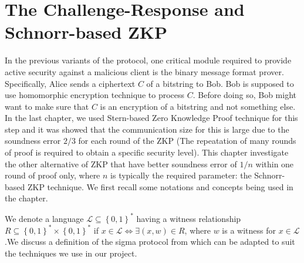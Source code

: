 \section{The Challenge-Response and Schnorr-based ZKP}
\label{sec:6challenge}
In the previous variants of the protocol, one critical module required to
provide active security against a malicious client is the binary message format
prover. Specifically, Alice sends a ciphertext \(C\) of a bitstring to Bob. Bob
is supposed to use homomorphic encryption technique to process \(C\). Before
doing so, Bob might want to make sure that \(C\) is an encryption of a bitstring
and not something else. In the last chapter, we used Stern-based Zero Knowledge
Proof technique for this step and it was showed that the communication size for
this is large due to the soundness error $2/3$ for each round of the ZKP (The
repeatation of many rounds of proof is required to obtain a specific security
level). This chapter investigate the other alternative of ZKP that have better
soundness error of $1/n$ within one round of proof only, where $n$ is typically
the required parameter: the Schnorr-based ZKP technique. We first recall some
notations and concepts being used in the chapter.

We denote a language $\mathcal{L} \subseteq \left\{ 0,1 \right\}^* $ having a
witness relationship
$R \subseteq \left\{ 0,1 \right\}^* \times \left\{ 0,1 \right\}^*$ if
$x \in \mathcal{L} \iff \exists (x,w) \in R$, where $w$ is a witness for
$x \in \mathcal{L}$.We discuss a definition of the sigma protocol from
\cite{benhamouda2014better} which can be adapted to suit the techniques we use
in our project.

